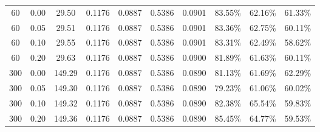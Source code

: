\begin{table}[htbp]
\begin{tabular}{ccc|cccc|ccc}
60 & 0.00 & 29.50 & 0.1176 & 0.0887 & 0.5386 & 0.0901 & 83.55\% & 62.16\% & 61.33\% \\
60 & 0.05 & 29.51 & 0.1176 & 0.0887 & 0.5386 & 0.0901 & 83.36\% & 62.75\% & 60.11\% \\
60 & 0.10 & 29.55 & 0.1176 & 0.0887 & 0.5386 & 0.0901 & 83.31\% & 62.49\% & 58.62\% \\
60 & 0.20 & 29.63 & 0.1176 & 0.0887 & 0.5386 & 0.0900 & 81.89\% & 61.63\% & 60.11\% \\
300 & 0.00 & 149.29 & 0.1176 & 0.0887 & 0.5386 & 0.0890 & 81.13\% & 61.69\% & 62.29\% \\
300 & 0.05 & 149.30 & 0.1176 & 0.0887 & 0.5386 & 0.0890 & 79.23\% & 61.06\% & 60.02\% \\
300 & 0.10 & 149.32 & 0.1176 & 0.0887 & 0.5386 & 0.0890 & 82.38\% & 65.54\% & 59.83\% \\
300 & 0.20 & 149.36 & 0.1176 & 0.0887 & 0.5386 & 0.0890 & 85.45\% & 64.77\% & 59.53\% \\
\hline
\end{tabular}
\end{table}
